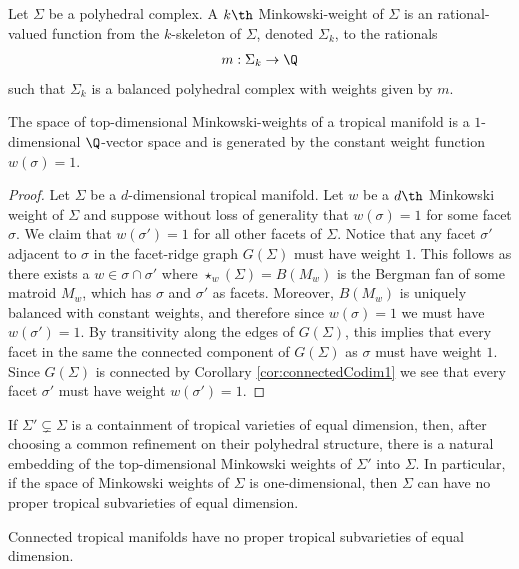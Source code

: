 \begin{definition}
    Let $\Sigma$ be a polyhedral complex. A $k\th$ Minkowski-weight of $\Sigma$ is an rational-valued function from the $k$-skeleton of $\Sigma$, denoted $\Sigma_k$, to the rationals
    \begin{align*}
        m:\Sigma_k \to \Q
    \end{align*}
    such that $\Sigma_k$ is a balanced polyhedral complex with weights given by $m$. 
\end{definition}


\begin{corollary}\label{cor:minkWeights}
The space of top-dimensional Minkowski-weights of a tropical manifold is a $1$-dimensional $\Q$-vector space and is generated by the constant weight function $w(\sigma)=1$. 
\end{corollary}
\begin{proof}
    Let $\Sigma$ be a $d$-dimensional tropical manifold. Let $w$ be a $d\th$ Minkowski weight of $\Sigma$ and suppose without loss of generality that $w(\sigma)=1$ for some facet $\sigma$. We claim that $w(\sigma')=1$ for all other facets of $\Sigma$. Notice that any facet $\sigma'$ adjacent to $\sigma$ in the facet-ridge graph $G(\Sigma)$ must have weight $1$. This follows as there exists a $w\in \sigma\cap\sigma'$ where $\star_w(\Sigma)=B(M_w)$ is the Bergman fan of some matroid $M_w$, which has $\sigma$ and $\sigma'$ as facets. Moreover, $B(M_w)$ is uniquely balanced with constant weights, and therefore since $w(\sigma)=1$ we must have $w(\sigma')=1$. By transitivity along the edges of $G(\Sigma)$, this implies that every facet in the same the connected component of $G(\Sigma)$ as $\sigma$ must have weight $1$. Since $G(\Sigma)$ is connected by Corollary \ref{cor:connectedCodim1} we see that every facet $\sigma'$ must have weight $w(\sigma')=1$.
    
\end{proof}
If $\Sigma'\subsetneq \Sigma$ is a containment of tropical varieties of equal dimension, then, after choosing a common refinement on their polyhedral structure, there is a natural embedding of the top-dimensional Minkowski weights of $\Sigma'$ into $\Sigma$. In particular, if the space of Minkowski weights of $\Sigma$ is one-dimensional, then $\Sigma$ can have no proper tropical subvarieties of equal dimension.

\begin{corollary}
    Connected tropical manifolds have no proper tropical subvarieties of equal dimension.
\end{corollary}

